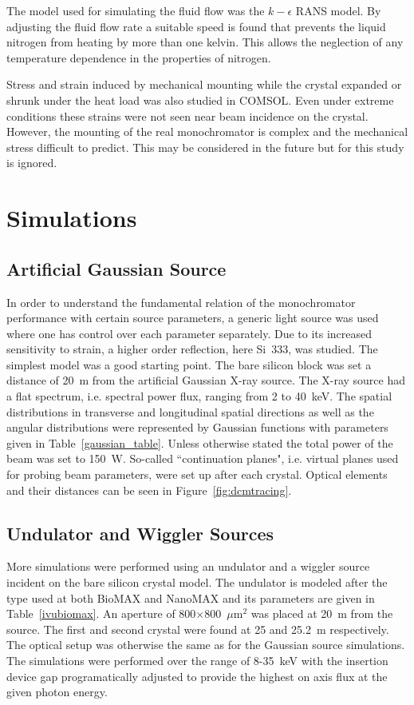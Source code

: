 \documentclass[preprint]{iucr}              %
\begin{document}
The model used for simulating the fluid flow was the $k-\epsilon$ RANS model. By adjusting the fluid flow rate a suitable speed is found that prevents the liquid nitrogen from heating by more than one kelvin. This allows the neglection of any temperature dependence in the properties of nitrogen.

Stress and strain induced by mechanical mounting while the crystal expanded or shrunk under the heat load was also studied in COMSOL. Even under extreme conditions these strains were not seen near beam incidence on the crystal. However, the mounting of the real monochromator is complex and the mechanical stress difficult to predict. This may be considered in the future but for this study is ignored.

\section{Simulations}

\subsection{Artificial Gaussian Source}
In order to understand the fundamental relation of the monochromator performance with certain source parameters, a generic light source was used where one has control over each parameter separately. Due to its increased sensitivity to strain, a higher order reflection, here Si~333, was studied. The simplest model was a good starting point. The bare silicon block was set a distance of 20~m from the artificial Gaussian X-ray source. The X-ray source had a flat spectrum, i.e. spectral power flux, ranging from 2 to 40~keV. The spatial distributions in transverse and longitudinal spatial directions as well as the angular distributions were represented by Gaussian functions with parameters given in Table~\ref{gaussian_table}. Unless otherwise stated the total power of the beam was set to 150~W. So-called ``continuation planes", i.e. virtual planes used for probing beam parameters, were set up after each crystal. Optical elements and their distances can be seen in Figure~\ref{fig:dcmtracing}.

\subsection{Undulator and Wiggler Sources}\label{undulatorsource}
More simulations were performed using an undulator and a wiggler source incident on the bare silicon crystal model. The undulator is modeled after the type used at both BioMAX and NanoMAX and its parameters are given in Table~\ref{ivubiomax}. An aperture of 800$\times$800~$\mu$m$^2$ was placed at 20~m from the source. The first and second crystal were found at 25 and 25.2~m respectively. The optical setup was otherwise the same as for the Gaussian source simulations. The simulations were performed over the range of 8-35~keV with the insertion device gap programatically adjusted to provide the highest on axis flux at the given photon energy.
\end{document}

